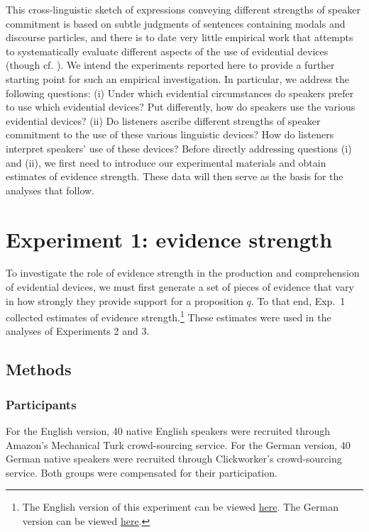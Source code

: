 \documentclass[11pt]{article}
\begin{document}
This cross-linguistic sketch of expressions conveying different strengths of speaker commitment is based on subtle judgments of sentences containing modals and discourse particles, and there is to date very little empirical work that attempts to systematically evaluate different aspects of the use of evidential devices (though cf. \cite{KnobeYalcin2014,LassiterInpress}). We intend the experiments reported here to provide a further starting point for such an empirical investigation. In particular, we address the following questions: (i) Under which evidential circumstances do speakers prefer to use which evidential devices?  Put differently, how do speakers use the various evidential devices? (ii) Do listeners ascribe different strengths of speaker commitment to the use of these various linguistic devices? How do listeners interpret speakers' use of these devices? Before directly addressing questions (i) and (ii), we first need to introduce our experimental materials and obtain estimates of evidence strength. These data will then serve as the basis for the analyses that follow.


\section{Experiment 1: evidence strength}

To investigate the role of evidence strength in the production and comprehension of evidential devices, we must first generate a set of pieces of evidence that vary in how strongly they provide support for a proposition $q$. To that end, Exp.~1 collected estimates of evidence strength.\footnote{The English version of this experiment can be viewed \href{https://web.stanford.edu/~justinek/modals_exp/evidence.html}{here}. The German version can be viewed \href{http://web.stanford.edu/~jdegen/cgi-bin/4_dp_priors_evidencestrength/evidence.html}{here}.} These estimates were used in the analyses of Experiments 2 and 3.

\subsection{Methods}

\subsubsection{Participants}

For the English version, 40 native English speakers were recruited through Amazon's Mechanical Turk crowd-sourcing service. For the German version, 40 German native speakers were recruited through Clickworker's crowd-sourcing service. Both groups were compensated for their participation.
\end{document}
